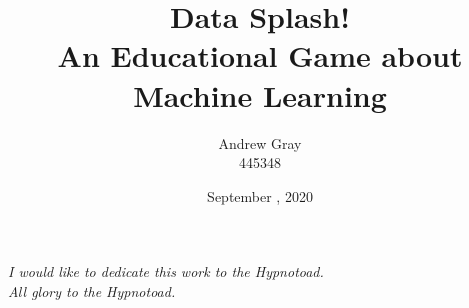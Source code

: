 \documentclass[11pt, a4paper, twoside, openright]{custard}
\begin{document}
	
	\title{Data Splash! \protect\\An Educational Game about Machine Learning}
	\author{Andrew Gray\protect\\{\normalsize 445348}}
	
	
	\date{September , 2020}
	
	
	
	\frontmatter%
	\maketitle
	\declaration
	\cleardoublepage
	
	\begin{vplace}[0.7]
		\begin{large}
			\begin{center}
				\textit{I would like to dedicate this work to the Hypnotoad.\\All glory to the Hypnotoad.}
			\end{center}
		\end{large}
	\end{vplace}
\end{document}

